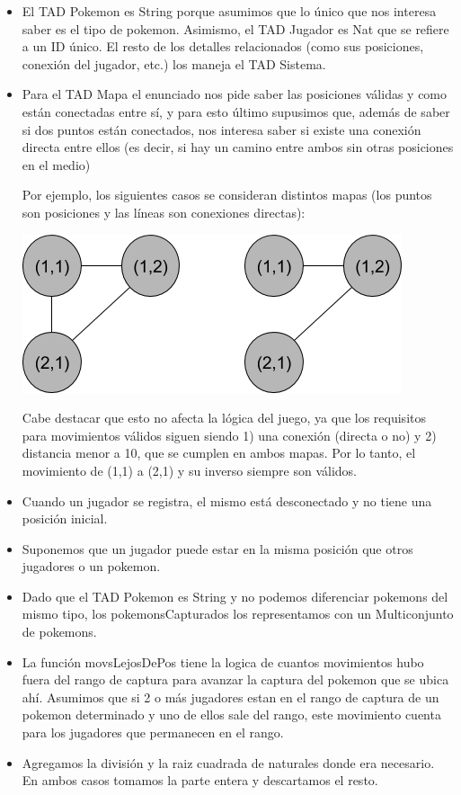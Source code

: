 \renewcommand{\labelitemi}{\textbullet}
\begin{itemize}

\item El TAD Pokemon es String porque asumimos que lo \'unico que nos interesa saber es el tipo de pokemon. Asimismo, el TAD Jugador es Nat que se refiere a un ID \'unico. El resto de los detalles relacionados (como sus posiciones, conexi\'on del jugador, etc.) los maneja el TAD Sistema.

\item Para el TAD Mapa el enunciado nos pide saber las posiciones v\'alidas y como est\'an conectadas entre s\'i, y para esto \'ultimo supusimos que, adem\'as de saber si dos puntos est\'an conectados, nos interesa saber si existe una conexi\'on directa entre ellos (es decir, si hay un camino entre ambos sin otras posiciones en el medio)

Por ejemplo, los siguientes casos se consideran distintos mapas (los puntos son posiciones y las l\'ineas son conexiones directas):

\bigskip
\centerline{\includegraphics[scale=0.5]{nodos-mapa.png}}

Cabe destacar que esto no afecta la l\'ogica del juego, ya que los requisitos para movimientos v\'alidos siguen siendo 1) una conexi\'on (directa o no) y 2) distancia menor a 10, que se cumplen en ambos mapas. Por lo tanto, el movimiento de (1,1) a (2,1) y su inverso siempre son v\'alidos.

\item Cuando un jugador se registra, el mismo est\'a desconectado y no tiene una posici\'on inicial.

\item Suponemos que un jugador puede estar en la misma posici\'on que otros jugadores o un pokemon.

\item Dado que el TAD Pokemon es String y no podemos diferenciar pokemons del mismo tipo, los pokemonsCapturados los representamos con un Multiconjunto de pokemons.

\item La función movsLejosDePos tiene la logica de cuantos movimientos hubo fuera del rango de captura para avanzar la captura del pokemon que se ubica ahí. Asumimos que si 2 o m\'as jugadores estan en el rango de captura de un pokemon determinado y uno de ellos sale del rango, este movimiento cuenta para los jugadores que permanecen en el rango.

\item Agregamos la división y la raiz cuadrada de naturales donde era necesario. En ambos casos tomamos la parte entera y descartamos el resto.

\end{itemize}